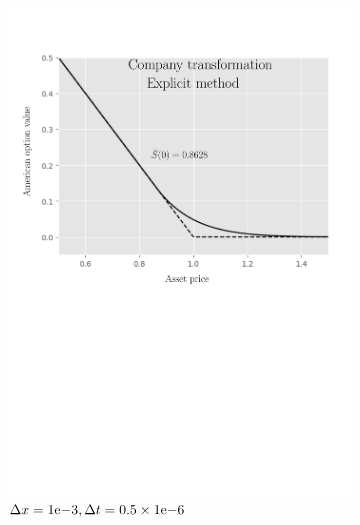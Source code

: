 \begin{figure}[tbp]
\begin{subfigure}{0.4\textwidth}
    \includegraphics[width=\textwidth]{chapters/chapter3/TestCase2CompanyExplicit.pdf}
    \caption{$\Delta{x}={1}\mathrm{e}{-3}, \Delta{t}=0.5\times{1}\mathrm{e}{-6}$}
    \label{fig:finitedifferencesschemes:numericaresults:test_case_2_explicit_company}
  \end{subfigure}
  \begin{subfigure}{0.4\textwidth}
    \centering

\end{subfigure}
\end{figure}
